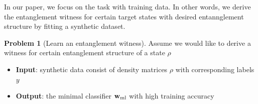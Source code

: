 \documentclass[
reprint,
aps,
pra,
floatfix,
]{revtex4-2}
\theoremstyle{plain}
\theoremstyle{definition}
\newtheorem{problem}{Problem}
\newcommand{\dm}{\rho}
\newcommand{\ml}{\text{ml}}
\begin{document}
In our paper, we focus on the task  with training data.
In other words, we derive the entanglement witness for certain target states with desired entannglement structure by fitting a synthetic dataset.
\begin{problem}[Learn an entanglement witness]
	Assume we would like to derive a witness for certain entanglement structure of a state $\dm$
	\begin{itemize}
		\item \textbf{Input}:  synthetic data consist of density matrices $\dm$ with corresponding labels $y$
		\item \textbf{Output}: the minimal classifier $\vbw_{\ml}$ with high training accuracy
	\end{itemize}
\end{problem}


\end{document}
